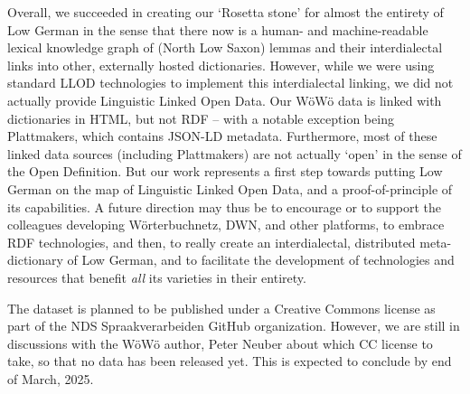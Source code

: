 Overall, we succeeded in creating our `Rosetta stone' for almost the entirety of Low German in the sense that there now is a human- and machine-readable lexical knowledge graph of (North Low Saxon) lemmas and their interdialectal links into other, externally hosted dictionaries.
However, while we were using standard LLOD technologies to implement this interdialectal linking, we did not actually provide Linguistic Linked Open Data. Our WöWö data is linked with dictionaries in HTML, but not RDF -- with a notable exception being Plattmakers, which contains JSON-LD metadata. 
Furthermore, most of these linked data sources (including Plattmakers) are not actually `open' in the sense of the Open Definition. 
But our work represents a first step towards putting Low German on the map of Linguistic Linked Open Data, and a proof-of-principle of its capabilities.
A future direction may thus be to encourage or to support the colleagues developing Wörterbuchnetz, DWN, and other platforms, to embrace RDF technologies, and then, to really create an interdialectal, distributed meta-dictionary of Low German, and to facilitate the development of technologies and resources that benefit \emph{all} its varieties in their entirety.

The dataset is planned to be published under a Creative Commons license as part of the NDS Spraakverarbeiden GitHub organization. However, we are still in discussions with the WöWö author, Peter Neuber about which CC license to take, so that no data has been released yet. This is expected to conclude by end of March, 2025.